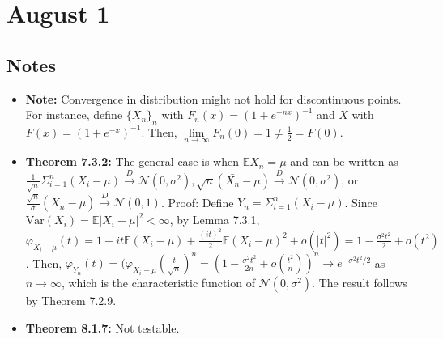 \documentclass[12pt]{article}
\newcommand{\E}{\mathbb{E}}
\newcommand{\V}{\text{Var}}
\begin{document}
\section*{August 1}

\subsection*{Notes}
\begin{itemize}
    \item \textbf{Note:} Convergence in distribution might not hold for discontinuous points. For instance, define $\{X_n\}_n$ with $F_n(x) = (1+e^{-nx})^{-1}$ and $X$ with $F(x) = (1+e^{-x})^{-1}$. Then, $\lim \limits_{n\to\infty} F_n(0) = 1 \neq \frac{1}{2} = F(0)$.
    \item \textbf{Theorem 7.3.2:} The general case is when $\E X_n = \mu$ and can be written as $\frac{1}{\sqrt{n}}\Sigma_{i=1}^n (X_i - \mu) \overset{D}{\to} \mathcal{N}(0, \sigma^2), \sqrt{n}(\bar{X_n} - \mu) \overset{D}{\to} \mathcal{N}(0, \sigma^2)$, or $\frac{\sqrt{n}}{\sigma}(\bar{X_n} - \mu) \overset{D}{\to} \mathcal{N}(0,1)$. Proof: Define $Y_n = \Sigma_{i=1}^n (X_i - \mu)$. Since $\V(X_i) = \E|X_i - \mu|^2 < \infty$, by Lemma 7.3.1, $\varphi_{X_i-\mu}(t) = 1 + it\E(X_i - \mu) + \frac{(it)^2}{2} \E(X_i - \mu)^2 + o(|t|^2) = 1 - \frac{\sigma^2 t^2}{2} + o(t^2)$. Then, $\varphi_{Y_n}(t) = (\varphi_{X_i-\mu}(\frac{t}{\sqrt{n}})^n = (1 - \frac{\sigma^2 t^2}{2n} + o(\frac{t^2}{n}))^n \to e^{-\sigma^2 t^2/2}$ as $n\to\infty$, which is the characteristic function of $\mathcal{N}(0,\sigma^2)$. The result follows by Theorem 7.2.9.
    \item \textbf{Theorem 8.1.7:} Not testable.
\end{itemize}
\end{document}
